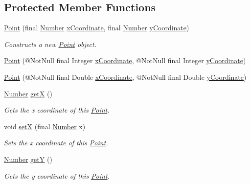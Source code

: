 \subsection*{Protected Member Functions}
\begin{DoxyCompactItemize}
\item 
\hyperlink{classcom_1_1aarrelaakso_1_1drawl_1_1_point_a1eb402d4971df738ea66227c7c12cb70}{Point} (final \hyperlink{interfacecom_1_1aarrelaakso_1_1drawl_1_1_number}{Number} \hyperlink{classcom_1_1aarrelaakso_1_1drawl_1_1_point_aa5144c5cca82c86f845bead6d4a51041}{x\+Coordinate}, final \hyperlink{interfacecom_1_1aarrelaakso_1_1drawl_1_1_number}{Number} \hyperlink{classcom_1_1aarrelaakso_1_1drawl_1_1_point_ab84afea50a66677c32ed2fd3100838c7}{y\+Coordinate})
\begin{DoxyCompactList}\small\item\em Constructs a new \hyperlink{classcom_1_1aarrelaakso_1_1drawl_1_1_point}{Point} object. \end{DoxyCompactList}\item 
\hyperlink{classcom_1_1aarrelaakso_1_1drawl_1_1_point_afb3376a5897946911a2230562fff07cf}{Point} (@Not\+Null final Integer \hyperlink{classcom_1_1aarrelaakso_1_1drawl_1_1_point_aa5144c5cca82c86f845bead6d4a51041}{x\+Coordinate}, @Not\+Null final Integer \hyperlink{classcom_1_1aarrelaakso_1_1drawl_1_1_point_ab84afea50a66677c32ed2fd3100838c7}{y\+Coordinate})
\item 
\hyperlink{classcom_1_1aarrelaakso_1_1drawl_1_1_point_acccdd3d1aeb08cc4315d415a546a3d95}{Point} (@Not\+Null final Double \hyperlink{classcom_1_1aarrelaakso_1_1drawl_1_1_point_aa5144c5cca82c86f845bead6d4a51041}{x\+Coordinate}, @Not\+Null final Double \hyperlink{classcom_1_1aarrelaakso_1_1drawl_1_1_point_ab84afea50a66677c32ed2fd3100838c7}{y\+Coordinate})
\item 
\hyperlink{interfacecom_1_1aarrelaakso_1_1drawl_1_1_number}{Number} \hyperlink{classcom_1_1aarrelaakso_1_1drawl_1_1_point_a39d39c84f2d05c9a2551cbc584c47bfc}{getX} ()
\begin{DoxyCompactList}\small\item\em Gets the x coordinate of this \hyperlink{classcom_1_1aarrelaakso_1_1drawl_1_1_point}{Point}. \end{DoxyCompactList}\item 
void \hyperlink{classcom_1_1aarrelaakso_1_1drawl_1_1_point_acf1cca24c7cf879f402e1b549a5e3864}{setX} (final \hyperlink{interfacecom_1_1aarrelaakso_1_1drawl_1_1_number}{Number} x)
\begin{DoxyCompactList}\small\item\em Sets the x coordinate of this \hyperlink{classcom_1_1aarrelaakso_1_1drawl_1_1_point}{Point}. \end{DoxyCompactList}\item 
\hyperlink{interfacecom_1_1aarrelaakso_1_1drawl_1_1_number}{Number} \hyperlink{classcom_1_1aarrelaakso_1_1drawl_1_1_point_a8247f55c36600e067be27a1586255767}{getY} ()
\begin{DoxyCompactList}\small\item\em Gets the y coordinate of this \hyperlink{classcom_1_1aarrelaakso_1_1drawl_1_1_point}{Point}. \end{DoxyCompactList}\end{DoxyCompactItemize}
